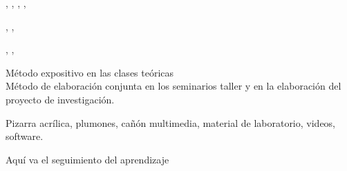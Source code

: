 \documentclass[a4paper,8pt]{article}
\begin{document}
\begin{contenidos}
\cite{byers10}, \cite{ries11}, \cite{congreso96}, \cite{congreso97}, \cite{garzozi14} 


\nextUnidad{}
\nextCapitulo{}

\cite{byers10}, \cite{blank12}, \cite{garzozi14} 


\nextUnidad{}
\nextCapitulo{}

\cite{byers10}, \cite{blank12}, \cite{garzozi14} 





\end{contenidos}




\begin{estrategiasEnsenanza}
    \begin{metodos}
        Método expositivo en las clases teóricas \\
        Método de elaboración conjunta en los seminarios taller y en la elaboración del proyecto de investigación.
    \end{metodos}
    \begin{medios}
        Pizarra acrílica, plumones, cañón multimedia, material de laboratorio, videos, software.
    \end{medios}
    \begin{formasOrganizacion}
    \end{formasOrganizacion}
    \begin{programacion}
    \end{programacion}
    \begin{segumientoAprendizaje}
        Aquí va el seguimiento del aprendizaje
    \end{segumientoAprendizaje}
\end{estrategiasEnsenanza}
\end{document}
